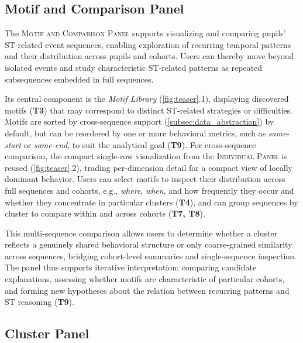 \documentclass[letterpaper,journal]{IEEEtran}
\begin{document}
\subsection{Motif and Comparison Panel}
\label{subsec:comparison_panel}

The \textsc{Motif and Comparison Panel} supports visualizing and comparing pupils' ST-related event sequences, enabling exploration of recurring temporal patterns and their distribution across pupils and cohorts. 
Users can thereby move beyond isolated events and study characteristic ST-related patterns as repeated subsequences embedded in full sequences.

Its central component is the \textit{Motif Library} (\cref{fig:teaser}.1), displaying discovered motifs (\textbf{T3}) that may correspond to distinct ST-related strategies or difficulties. 
Motifs are sorted by cross-sequence support (\cref{subsec:data_abstraction}) by default, but can be reordered by one or more behavioral metrics, such as \textit{same-start} or \textit{same-end}, to suit the analytical goal (\textbf{T9}). 
For cross-sequence comparison, the compact single-row visualization from the \textsc{Individual Panel} is reused (\cref{fig:teaser}.2), trading per-dimension detail for a compact view of locally dominant behavior.
Users can select motifs to inspect their distribution across full sequences and cohorts, e.g., \textit{where}, \textit{when}, and how frequently they occur and whether they concentrate in particular clusters (\textbf{T4}), and can group sequences by cluster to compare within and across cohorts (\textbf{T7, T8}).

This multi-sequence comparison allows users to determine whether a cluster reflects a genuinely shared behavioral structure or only coarse-grained similarity across sequences, bridging cohort-level summaries and single-sequence inspection. 
The panel thus supports iterative interpretation: comparing candidate explanations, assessing whether motifs are characteristic of particular cohorts, and forming new hypotheses about the relation between recurring patterns and ST reasoning (\textbf{T9}).



\subsection{Cluster Panel}
\label{subsec:cluster_panel}
\end{document}

